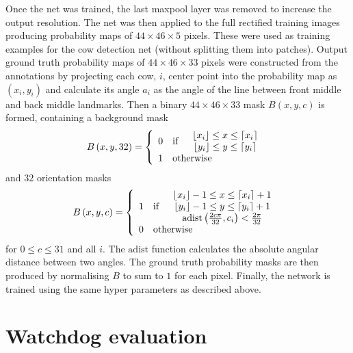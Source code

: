\documentclass{IET}
\begin{document}
Once the net was trained, the last maxpool layer was removed to increase the output resolution. The net was then applied to the full rectified training images producing probability maps of $44\times 46\times 5$ pixels. These were used as training examples for the cow detection net (without splitting them into patches). Output ground truth probability maps of $44\times 46\times 33$ pixels were constructed from the annotations by projecting each cow, $i$, center point into the probability map as $\left( x_i, y_i \right)$ and calculate its angle $a_i$ as the angle of the line between front middle and back middle landmarks. Then a binary $44\times 46\times 33$ mask $B\left( x, y, c \right)$ is formed, containing a background mask
\begin{equation}
B\left( x, y, 32 \right) = \left\lbrace
\begin{array}{clc}
0 & \text{if} &
\begin{array}{c}
 \lfloor x_i \rfloor \leq x \leq \lceil x_i \rceil \\
 \lfloor y_i \rfloor \leq y \leq \lceil y_i \rceil
\end{array}
\\
1 & \multicolumn{2}{l}{\text{otherwise}}
\end{array}
\right.
\end{equation}
and $32$ orientation masks
\begin{equation}
B\left( x, y, c \right) = \left\lbrace
\begin{array}{clc}
1 & \text{if} &
\begin{array}{c}
 \lfloor x_i \rfloor-1 \leq x \leq \lceil x_i \rceil+1 \\
 \lfloor y_i \rfloor-1 \leq y \leq \lceil y_i \rceil+1 \\
 \mathrm{adist}\left(\frac{2c\pi}{32}, c_i\right) < \frac{2\pi}{32} \\
\end{array}
\\
0 & \multicolumn{2}{l}{\text{otherwise}}
\end{array}
\right.
\end{equation}
for $0\leq c \leq 31$ and all $i$. The $\mathrm{adist}$ function calculates the absolute angular distance between two angles. The ground truth probability masks are then produced by normalising $B$ to sum to $1$ for each pixel. Finally, the network is trained using the same hyper parameters as described above.

\section{Watchdog evaluation}
\end{document}
